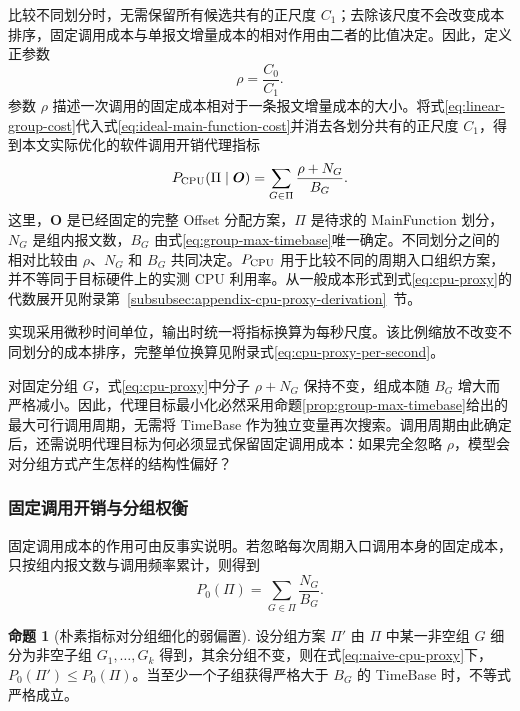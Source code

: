 \documentclass[UTF8,a4paper,twoside,zihao=-4]{ctexart}
\numberwithin{equation}{section}
\numberwithin{figure}{section}
\numberwithin{table}{section}
\theoremstyle{definition}
\newtheorem{proposition}{命题}
\numberwithin{algocf}{section}
\begin{document}
比较不同划分时，无需保留所有候选共有的正尺度 $C_1$；去除该尺度不会改变成本排序，固定调用成本与单报文增量成本的相对作用由二者的比值决定。因此，定义正参数
\begin{equation}
 \rho
 =
 \frac{C_0}{C_1}.
\label{eq:rho-definition}
\end{equation}
参数 $\rho$ 描述一次调用的固定成本相对于一条报文增量成本的大小。将式\eqref{eq:linear-group-cost}代入式\eqref{eq:ideal-main-function-cost}并消去各划分共有的正尺度 $C_1$，得到本文实际优化的软件调用开销代理指标
\begin{equation}
 P_{\rm CPU}(\Pi\mid\boldsymbol O)
 =
 \sum_{G\in\Pi}
 \frac{\rho+N_G}{B_G}.
\label{eq:cpu-proxy}
\end{equation}
这里，$\boldsymbol O$ 是已经固定的完整 Offset 分配方案，$\Pi$ 是待求的 MainFunction 划分，$N_G$ 是组内报文数，$B_G$ 由式\eqref{eq:group-max-timebase}唯一确定。不同划分之间的相对比较由 $\rho$、$N_G$ 和 $B_G$ 共同决定。$P_{\rm CPU}$ 用于比较不同的周期入口组织方案，并不等同于目标硬件上的实测 CPU 利用率。从一般成本形式到式\eqref{eq:cpu-proxy}的代数展开见附录第~\ref{subsubsec:appendix-cpu-proxy-derivation}~节。

实现采用微秒时间单位，输出时统一将指标换算为每秒尺度。该比例缩放不改变不同划分的成本排序，完整单位换算见附录式\eqref{eq:cpu-proxy-per-second}。

对固定分组 $G$，式\eqref{eq:cpu-proxy}中分子 $\rho+N_G$ 保持不变，组成本随 $B_G$ 增大而严格减小。因此，代理目标最小化必然采用命题\ref{prop:group-max-timebase}给出的最大可行调用周期，无需将 TimeBase 作为独立变量再次搜索。调用周期由此确定后，还需说明代理目标为何必须显式保留固定调用成本：如果完全忽略 $\rho$，模型会对分组方式产生怎样的结构性偏好？

\subsubsection{固定调用开销与分组权衡}
\label{subsubsec:proxy-boundary-split-bias}

固定调用成本的作用可由反事实说明。若忽略每次周期入口调用本身的固定成本，只按组内报文数与调用频率累计，则得到
\begin{equation}
 P_0(\Pi)
 =
 \sum_{G\in\Pi}\frac{N_G}{B_G}.
\label{eq:naive-cpu-proxy}
\end{equation}

\begin{proposition}[朴素指标对分组细化的弱偏置]
\label{prop:naive-split-bias}
设分组方案 $\Pi'$ 由 $\Pi$ 中某一非空组 $G$ 细分为非空子组 $G_1,\ldots,G_k$ 得到，其余分组不变，则在式\eqref{eq:naive-cpu-proxy}下，$P_0(\Pi')\le P_0(\Pi)$。当至少一个子组获得严格大于 $B_G$ 的 TimeBase 时，不等式严格成立。
\end{proposition}
\end{document}
